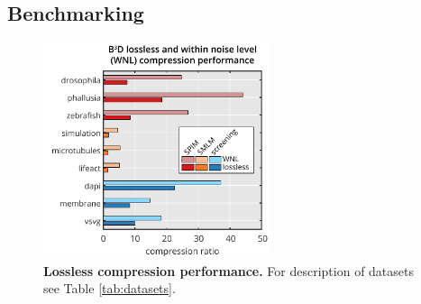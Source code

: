 \documentclass{diploma_style}
\begin{document}
\subsection{Benchmarking}

\begin{figure}[tpb]
 \centering
 \includegraphics[page=1,width=0.6\textwidth]{figures/4_gpu/Fig1c_compressionBars}
 \caption{\textbf{Lossless compression performance.}  For description of datasets see Table \ref{tab:datasets}.}
 \label{fig:benchmark}
\end{figure}
\end{document}
